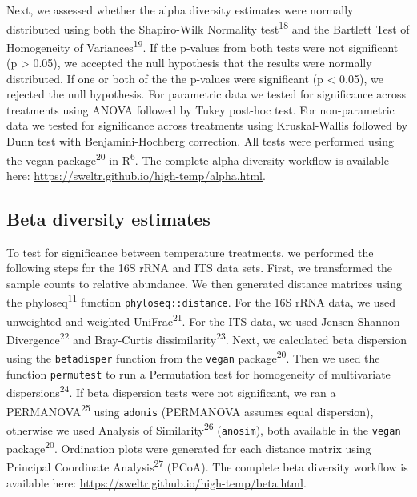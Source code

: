 \documentclass[
  10pt,
  letterpaper,
  DIV=11,
  numbers=noendperiod]{scrartcl}
\begin{document}
Next, we assessed whether the alpha diversity estimates were normally
distributed using both the Shapiro-Wilk Normality
test\textsuperscript{18} and the Bartlett Test of Homogeneity of
Variances\textsuperscript{19}. If the p-values from both tests were not
significant (p \textgreater{} 0.05), we accepted the null hypothesis
that the results were normally distributed. If one or both of the the
p-values were significant (p \textless{} 0.05), we rejected the null
hypothesis. For parametric data we tested for significance across
treatments using ANOVA followed by Tukey post-hoc test. For
non-parametric data we tested for significance across treatments using
Kruskal-Wallis followed by Dunn test with Benjamini-Hochberg correction.
All tests were performed using the vegan package\textsuperscript{20} in
R\textsuperscript{6}. The complete alpha diversity workflow is available
here: \url{https://sweltr.github.io/high-temp/alpha.html}.

\hypertarget{beta-diversity-estimates}{%
\subsection{Beta diversity estimates}\label{beta-diversity-estimates}}

To test for significance between temperature treatments, we performed
the following steps for the 16S rRNA and ITS data sets. First, we
transformed the sample counts to relative abundance. We then generated
distance matrices using the phyloseq\textsuperscript{11} function
\texttt{phyloseq::distance}. For the 16S rRNA data, we used unweighted
and weighted UniFrac\textsuperscript{21}. For the ITS data, we used
Jensen-Shannon Divergence\textsuperscript{22} and Bray-Curtis
dissimilarity\textsuperscript{23}. Next, we calculated beta dispersion
using the \texttt{betadisper} function from the \texttt{vegan}
package\textsuperscript{20}. Then we used the function
\texttt{permutest} to run a Permutation test for homogeneity of
multivariate dispersions\textsuperscript{24}. If beta dispersion tests
were not significant, we ran a PERMANOVA\textsuperscript{25} using
\texttt{adonis} (PERMANOVA assumes equal dispersion), otherwise we used
Analysis of Similarity\textsuperscript{26} (\texttt{anosim}), both
available in the \texttt{vegan} package\textsuperscript{20}. Ordination
plots were generated for each distance matrix using Principal Coordinate
Analysis\textsuperscript{27} (PCoA). The complete beta diversity
workflow is available here:
\url{https://sweltr.github.io/high-temp/beta.html}.
\end{document}
